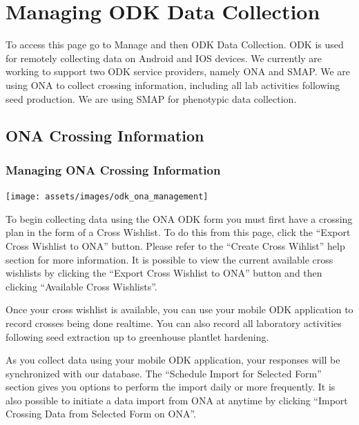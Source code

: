 \documentclass[
  12pt,
]{book}
\begin{document}
\hypertarget{managing-odk-data-collection}{%
\chapter{Managing ODK Data Collection}\label{managing-odk-data-collection}}

To access this page go to Manage and then ODK Data Collection. ODK is used for remotely collecting data on Android and IOS devices. We currently are working to support two ODK service providers, namely ONA and SMAP. We are using ONA to collect crossing information, including all lab activities following seed production. We are using SMAP for phenotypic data collection.

\hypertarget{ona-crossing-information}{%
\section{ONA Crossing Information}\label{ona-crossing-information}}

\hypertarget{managing-ona-crossing-information}{%
\subsection{Managing ONA Crossing Information}\label{managing-ona-crossing-information}}

\begin{center}\texttt{[image: assets/images/odk\_ona\_management]} \end{center}

To begin collecting data using the ONA ODK form you must first have a crossing plan in the form of a Cross Wishlist. To do this from this page, click the ``Export Cross Wishlist to ONA'' button. Please refer to the ``Create Cross Wihlist'' help section for more information. It is possible to view the current available cross wishlists by clicking the ``Export Cross Wishlist to ONA'' button and then clicking ``Available Cross Wishlists''.

Once your cross wishlist is available, you can use your mobile ODK application to record crosses being done realtime. You can also record all laboratory activities following seed extraction up to greenhouse plantlet hardening.

As you collect data using your mobile ODK application, your responses will be synchronized with our database. The ``Schedule Import for Selected Form'' section gives you options to perform the import daily or more frequently. It is also possible to initiate a data import from ONA at anytime by clicking ``Import Crossing Data from Selected Form on ONA''.
\end{document}
